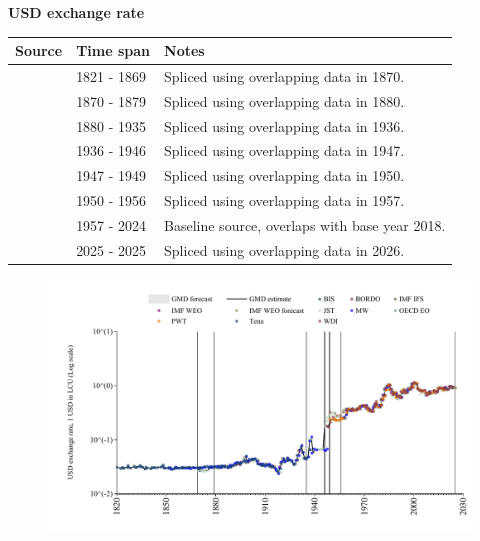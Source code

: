 \documentclass[12pt,a4paper,landscape]{article}
\begin{document}
\begin{adjustbox}{max totalsize={\paperwidth}{\paperheight},center}
\begin{minipage}[t][\textheight][t]{\textwidth}
\vspace*{0.5cm}
{}
\begin{center}
{\Large\bfseries USD exchange rate}
\end{center}
\vspace{0.5cm}
\begin{table}[H]
\centering
\small
\begin{tabular}{|l|l|l|}
\hline
\textbf{Source} & \textbf{Time span} & \textbf{Notes} \\
\hline
\rowcolor{white}\cite{Tena}& 1821 - 1869 &Spliced using overlapping data in 1870. \\
\rowcolor{lightgray}\cite{JST}& 1870 - 1879 &Spliced using overlapping data in 1880. \\
\rowcolor{white}\cite{BORDO}& 1880 - 1935 &Spliced using overlapping data in 1936. \\
\rowcolor{lightgray}\cite{JST}& 1936 - 1946 &Spliced using overlapping data in 1947. \\
\rowcolor{white}\cite{BORDO}& 1947 - 1949 &Spliced using overlapping data in 1950. \\
\rowcolor{lightgray}\cite{IMF_IFS}& 1950 - 1956 &Spliced using overlapping data in 1957. \\
\rowcolor{white}\cite{BIS}& 1957 - 2024 &Baseline source, overlaps with base year 2018. \\
\rowcolor{lightgray}\cite{OECD_EO}& 2025 - 2025 &Spliced using overlapping data in 2026. \\
\hline
\end{tabular}
\end{table}
\begin{figure}[H]
\centering
\includegraphics[width=\textwidth,height=0.6\textheight,keepaspectratio]{graphs/ESP_USDfx.pdf}
\end{figure}
\end{minipage}
\end{adjustbox}
\end{document}
